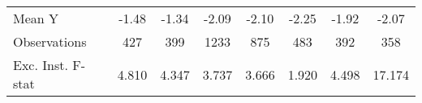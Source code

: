 {\begin{tabular}{l*{7}{c}}
\midrule
Mean Y      &       -1.48         &       -1.34         &       -2.09         &       -2.10         &       -2.25         &       -1.92         &       -2.07         \\
Observations&         427         &         399         &        1233         &         875         &         483         &         392         &         358         \\
Exc. Inst. F-stat&       4.810         &       4.347         &       3.737         &       3.666         &       1.920         &       4.498         &      17.174         \\
\bottomrule
\end{tabular}
}

